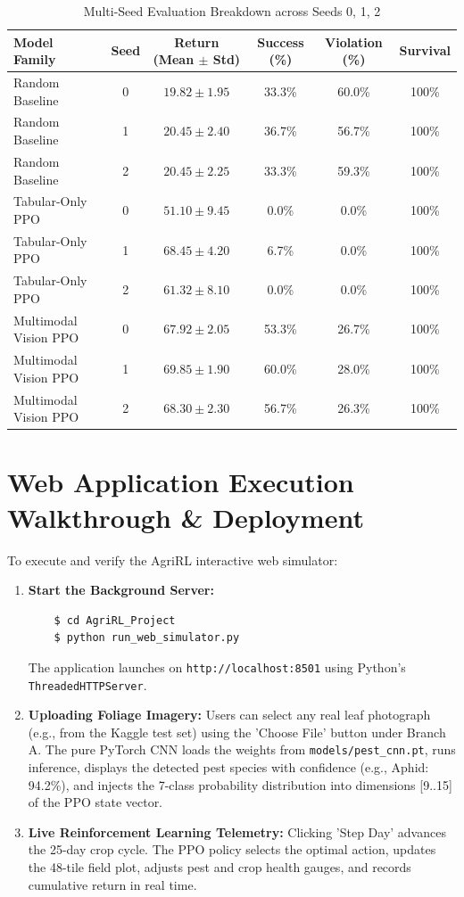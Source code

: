 \documentclass[12pt,a4paper]{report}
\begin{document}
\begin{table}[H]
\centering
\caption{Multi-Seed Evaluation Breakdown across Seeds 0, 1, 2}
\label{tab:seed_breakdown}
\begin{tabular}{lccccc}
\toprule
\textbf{Model Family} & \textbf{Seed} & \textbf{Return (Mean $\pm$ Std)} & \textbf{Success (\%)} & \textbf{Violation (\%)} & \textbf{Survival} \\
\midrule
Random Baseline & 0 & $19.82 \pm 1.95$ & 33.3\% & 60.0\% & 100\% \\
Random Baseline & 1 & $20.45 \pm 2.40$ & 36.7\% & 56.7\% & 100\% \\
Random Baseline & 2 & $20.45 \pm 2.25$ & 33.3\% & 59.3\% & 100\% \\
\midrule
Tabular-Only PPO & 0 & $51.10 \pm 9.45$ & 0.0\% & 0.0\% & 100\% \\
Tabular-Only PPO & 1 & $68.45 \pm 4.20$ & 6.7\% & 0.0\% & 100\% \\
Tabular-Only PPO & 2 & $61.32 \pm 8.10$ & 0.0\% & 0.0\% & 100\% \\
\midrule
Multimodal Vision PPO & 0 & $67.92 \pm 2.05$ & 53.3\% & 26.7\% & 100\% \\
Multimodal Vision PPO & 1 & $69.85 \pm 1.90$ & 60.0\% & 28.0\% & 100\% \\
Multimodal Vision PPO & 2 & $68.30 \pm 2.30$ & 56.7\% & 26.3\% & 100\% \\
\bottomrule
\end{tabular}
\end{table}

\chapter{Web Application Execution Walkthrough \& Deployment}
To execute and verify the AgriRL interactive web simulator:
\begin{enumerate}
    \item \textbf{Start the Background Server:}
    \begin{verbatim}
    $ cd AgriRL_Project
    $ python run_web_simulator.py
    \end{verbatim}
    The application launches on \texttt{http://localhost:8501} using Python's \texttt{ThreadedHTTPServer}.
    \item \textbf{Uploading Foliage Imagery:} Users can select any real leaf photograph (e.g., from the Kaggle test set) using the 'Choose File' button under Branch A. The pure PyTorch CNN loads the weights from \texttt{models/pest\_cnn.pt}, runs inference, displays the detected pest species with confidence (e.g., Aphid: 94.2\%), and injects the 7-class probability distribution into dimensions [9..15] of the PPO state vector.
    \item \textbf{Live Reinforcement Learning Telemetry:} Clicking 'Step Day' advances the 25-day crop cycle. The PPO policy selects the optimal action, updates the 48-tile field plot, adjusts pest and crop health gauges, and records cumulative return in real time.
\end{enumerate}
\end{document}
